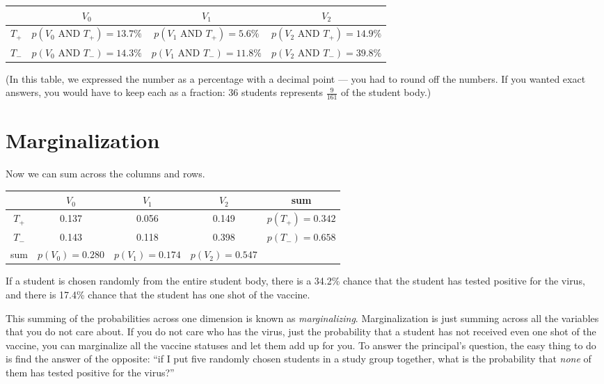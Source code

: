 \begin{tabular}{c | c c c}
  & $V_0$ & $V_1$ & $V_2$ \\
  \hline
  $T_{+}$ & $p(V_0 \text{ AND } T_{+}) = 13.7\%$ & $p(V_1 \text{ AND } T_{+}) = 5.6\%$ & $p(V_2 \text{ AND } T_{+}) = 14.9\%$\\
  $T_{-}$ & $p(V_0 \text{ AND } T_{-}) = 14.3\%$ & $p(V_1 \text{ AND } T_{-}) = 11.8\%$ & $p(V_2 \text{ AND } T_{-}) = 39.8\%$
\end{tabular}

(In this table, we expressed the number as a percentage with a decimal
point --- you had to round off the numbers. If you wanted exact answers, you
would have to keep each as a fraction: 36 students represents
$\frac{9}{161}$ of the student body.)

\section{Marginalization}

Now we can sum across the columns and rows.

\begin{tabular}{c | c c c | c}
  & $V_0$ & $V_1$ & $V_2$ & sum \\
  \hline
  $T_{+}$ & 0.137 & 0.056 & 0.149 & $p(T_{+}) = 0.342$\\
  $T_{-}$ & 0.143 & 0.118 & 0.398 & $p(T_{-}) = 0.658$\\
  \hline
  sum & $p(V_0) = 0.280$ & $p(V_1) = 0.174$ & $p(V_2) = 0.547$ & 
\end{tabular}

If a student is chosen randomly from the entire student body, there is
a 34.2\% chance that the student has tested positive for the virus, and there is
17.4\% chance that the student has one shot of the vaccine.

This summing of the probabilities across one dimension is known as
\textit{marginalizing}. Marginalization is just summing across all the
variables that you do not care about. If you do not care who has the virus,
just the probability that a student has not received even one shot of
the vaccine, you can marginalize all the vaccine statuses and let them add up for you.
To answer the principal's question, the easy thing to do is find the
answer of the opposite: ``if I put five randomly chosen students in a
study group together, what is the probability that \textit{none} of
them has tested positive for the virus?''

